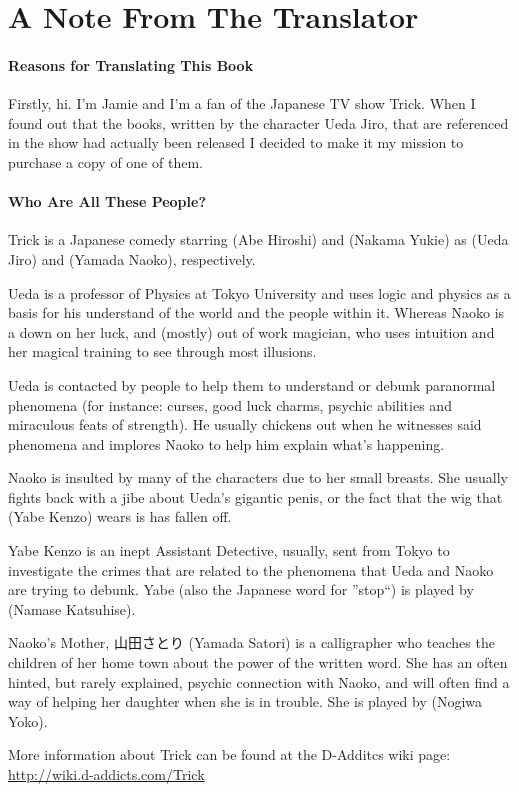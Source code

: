 \chapter*{A Note From The Translator}
\subsubsection{Reasons for Translating This Book}
Firstly, hi. I'm Jamie and I'm a fan of the Japanese TV show Trick. When I found out that the books, written by the character Ueda Jiro, that are referenced in the show had actually been released I decided to make it my mission to purchase a copy of one of them.
\subsubsection{Who Are All These People?}
Trick is a Japanese comedy starring  (Abe Hiroshi) and  (Nakama Yukie) as  (Ueda Jiro) and  (Yamada Naoko), respectively.
\par Ueda is a professor of Physics at Tokyo University and uses logic and physics as a basis for his understand of the world and the people within it. Whereas Naoko is a down on her luck, and (mostly) out of work magician, who uses intuition and her magical training to see through most illusions.
\par Ueda is contacted by people to help them to understand or debunk paranormal phenomena (for instance: curses, good luck charms, psychic abilities and miraculous feats of strength). He usually chickens out when he witnesses said phenomena and implores Naoko to help him explain what's happening.
\par Naoko is insulted by many of the characters due to her small breasts. She usually fights back with a jibe about Ueda's gigantic penis, or the fact that the wig that  (Yabe Kenzo) wears is has fallen off.
\par Yabe Kenzo is an inept Assistant Detective, usually, sent from Tokyo to investigate the crimes that are related to the phenomena that Ueda and Naoko are trying to debunk. Yabe (also the Japanese word for ''stop``) is played by  (Namase Katsuhise).
\par Naoko's Mother, 山田さとり (Yamada Satori) is a calligrapher who teaches the children of her home town about the power of the written word. She has an often hinted, but rarely explained, psychic connection with Naoko, and will often find a way of helping her daughter when she is in trouble. She is played by  (Nogiwa Yoko).
\par More information about Trick can be found at the D-Additcs wiki page: \url{http://wiki.d-addicts.com/Trick}